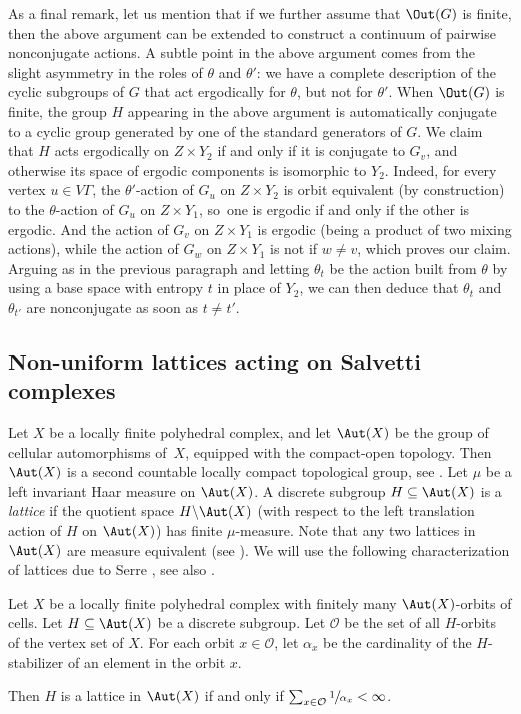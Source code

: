 \begin{rk}
As a final remark, let us mention that if we further assume that $\Out(G)$ is finite, then the above argument can be extended to construct a continuum of pairwise nonconjugate actions. A subtle point in the above argument comes from the slight asymmetry in the roles of $\theta$ and $\theta'$: we have a complete description of the cyclic subgroups of $G$ that act ergodically for $\theta$, but not for $\theta'$. When $\Out(G)$ is finite, the group $H$ appearing in the above argument is automatically conjugate to a cyclic group generated by one of the standard generators of $G$. We claim that $H$ acts ergodically on $Z\times Y_2$ if and only if it is conjugate to $G_v$, and otherwise its space of ergodic components is isomorphic to $Y_2$. Indeed, for every vertex $u\in V\Gamma$, the $\theta'$-action of $G_u$ on $Z\times Y_2$ is orbit equivalent (by construction) to the $\theta$-action of $G_u$ on $Z\times Y_1$, so~one is ergodic if and only if the other is ergodic. And the action of $G_v$ on $Z\times Y_1$ is ergodic (being a product of two mixing actions), while the action of $G_w$ on $Z\times Y_1$ is not if $w\neq v$, which proves our claim. Arguing as in the previous paragraph and letting $\theta_t$ be the action built from $\theta$ by using a base space with entropy $t$ in place of $Y_2$, we can then deduce that $\theta_t$ and $\theta_{t'}$ are nonconjugate as soon as $t\neq t'$.
\end{rk}

\subsection{Non-uniform lattices acting on Salvetti complexes}

Let $X$ be a locally finite polyhedral complex, and let $\Aut(X)$ be the group of cellular automorphisms of~$X$, equipped with the compact-open topology. Then $\Aut(X)$ is a second countable locally compact topological group, see \eg \cite[Ex.\,5.B.11]{cornulier2014metric}. Let $\mu$ be a left invariant Haar measure on $\Aut(X)$. A discrete subgroup $H\subseteq \Aut(X)$ is a \emph{lattice} if the quotient space $H\backslash\Aut(X)$ (with respect to the left translation action of $H$ on $\Aut(X)$) has finite $\mu$-measure. Note that any two lattices in $\Aut(X)$ are measure equivalent (see \eg \cite[Ex.\,1.2]{Fur}). We will use the following characterization of lattices due to Serre \cite{Serre}, see also \cite[Chap.\,1.5]{bass2001tree}.

\begin{theo}[Serre]
\label{theo:non-uniform lattice}
Let $X$ be a locally finite polyhedral complex with finitely many $\Aut(X)$-orbits of cells. Let $H\subseteq \Aut(X)$ be a discrete subgroup. Let $\mathcal{O}$ be the set of all $H$-orbits of the vertex set of $X$. For each orbit $x\in\mathcal{O}$, let $\alpha_x$ be the cardinality of the $H$-stabilizer of an element in the orbit $x$.

Then $H$ is a lattice in $\Aut(X)$ if and only if $\sum_{x\in \mathcal{O}}\sfrac{1}{\alpha_x}<\infty$.
\end{theo}

